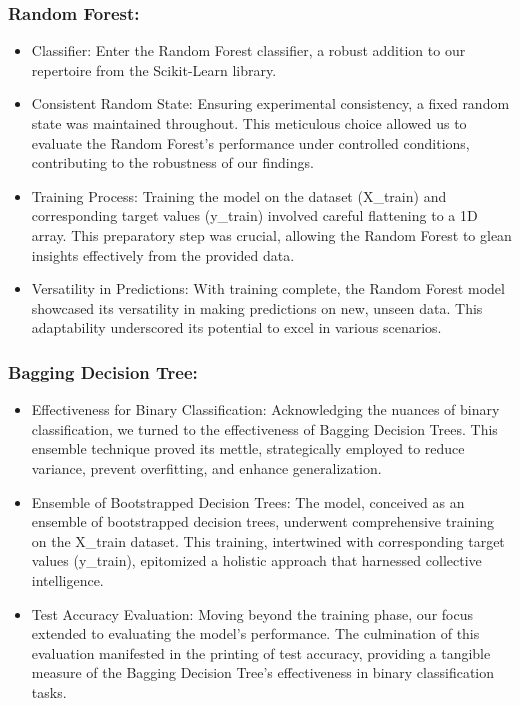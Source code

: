 \documentclass[ 12pt,a4paper,twocolumn,fleqn]{report}
\begin{document}
\subsubsection{Random Forest:}
\vspace{2mm}
\begin{itemize}
    \item Classifier: Enter the Random Forest classifier, a robust addition to our repertoire from the
Scikit-Learn library.
\item  Consistent Random State: Ensuring experimental consistency, a fixed random state was
maintained throughout. This meticulous choice allowed us to evaluate the Random Forest's
performance under controlled conditions, contributing to the robustness of our findings.
\item  Training Process: Training the model on the dataset (X\_train) and corresponding target values
(y\_train) involved careful flattening to a 1D array. This preparatory step was crucial, allowing
the Random Forest to glean insights effectively from the provided data.
\item  Versatility in Predictions: With training complete, the Random Forest model showcased its
versatility in making predictions on new, unseen data. This adaptability underscored its potential
to excel in various scenarios.
\end{itemize}
\subsubsection{Bagging Decision Tree:}
\vspace{2mm}
\begin{itemize}
    \item Effectiveness for Binary Classification: Acknowledging the nuances of binary classification,
we turned to the effectiveness of Bagging Decision Trees. This ensemble technique proved its
mettle, strategically employed to reduce variance, prevent overfitting, and enhance
generalization.
\item Ensemble of Bootstrapped Decision Trees: The model, conceived as an ensemble of
bootstrapped decision trees, underwent comprehensive training on the X\_train dataset. This
training, intertwined with corresponding target values (y\_train), epitomized a holistic approach
that harnessed collective intelligence.
\item Test Accuracy Evaluation: Moving beyond the training phase, our focus extended to evaluating
the model's performance. The culmination of this evaluation manifested in the printing of test
accuracy, providing a tangible measure of the Bagging Decision Tree's effectiveness in binary
classification tasks.
\end{itemize}
\newpage
  \pagestyle{fancy}
\thisfancypage{%
  \setlength{\fboxsep}{20pt}\doublebox}{}
\normalsize
\end{document}
